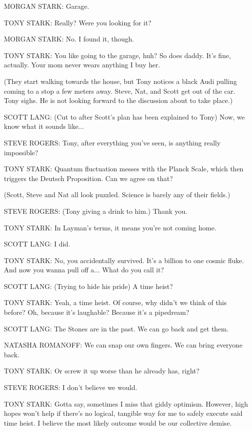 MORGAN STARK: Garage.

TONY STARK: Really? Were you looking for it?

MORGAN STARK: No. I found it, though.

TONY STARK: You like going to the garage, huh? So does daddy. It's fine, actually. Your mom never wears anything I buy her.

(They start walking towards the house, but Tony notices a black Audi pulling coming to a stop a few meters away. Steve, Nat, and Scott get out of the car. Tony sighs. He is not looking forward to the discussion about to take place.)

SCOTT LANG: (Cut to after Scott's plan has been explained to Tony) Now, we know what it sounds like...

STEVE ROGERS: Tony, after everything you've seen, is anything really impossible?

TONY STARK: Quantum fluctuation messes with the Planck Scale, which then triggers the Deutsch Proposition. Can we agree on that?

(Scott, Steve and Nat all look puzzled. Science is barely any of their fields.)

STEVE ROGERS: (Tony giving a drink to him.) Thank you.

TONY STARK: In Layman's terms, it means you're not coming home.

SCOTT LANG: I did.

TONY STARK: No, you accidentally survived. It's a billion to one cosmic fluke. And now you wanna pull off a... What do you call it?

SCOTT LANG: (Trying to hide his pride) A time heist?

TONY STARK: Yeah, a time heist. Of course, why didn't we think of this before? Oh, because it's laughable? Because it's a pipedream?

SCOTT LANG: The Stones are in the past. We can go back and get them.

NATASHA ROMANOFF: We can snap our own fingers. We can bring everyone back.

TONY STARK: Or screw it up worse than he already has, right?

STEVE ROGERS: I don't believe we would.

TONY STARK: Gotta say, sometimes I miss that giddy optimism. However, high hopes won't help if there's no logical, tangible way for me to safely execute said time heist. I believe the most likely outcome would be our collective demise.

